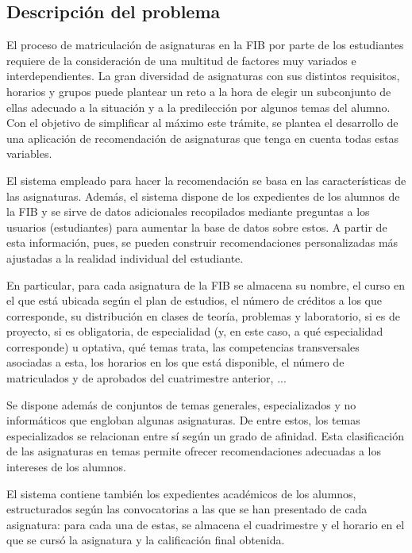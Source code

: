 
\subsection{Descripción del problema} \label{sec:descripcion}

El proceso de matriculación de asignaturas en la FIB por parte de los 
estudiantes requiere de la consideración de una multitud de factores muy 
variados e interdependientes. La gran diversidad de asignaturas con sus 
distintos requisitos, horarios y grupos puede plantear un reto a la hora de 
elegir un subconjunto de ellas adecuado a la situación y a la predilección 
por algunos temas del alumno. Con el objetivo de simplificar al máximo este 
trámite, se plantea el desarrollo de una aplicación de recomendación de 
asignaturas que tenga en cuenta todas estas variables.

El sistema empleado para hacer la recomendación se basa en las características 
de las asignaturas. Además, el sistema dispone de los expedientes de los 
alumnos de la FIB y se sirve de datos adicionales recopilados mediante 
preguntas a los usuarios (estudiantes) para aumentar la base de datos sobre 
estos. A partir de esta información, pues, se pueden construir recomendaciones 
personalizadas más ajustadas a la realidad individual del estudiante.

En particular, para cada asignatura de la FIB se almacena su nombre, el curso 
en el que está ubicada según el plan de estudios, el número de créditos a los 
que corresponde, su distribución en clases de teoría, problemas y laboratorio, 
si es de proyecto, si es obligatoria, de especialidad (y, en este caso, a qué 
especialidad corresponde) u optativa, qué temas trata, las competencias 
transversales asociadas a esta, los horarios en los que está disponible, el 
número de matriculados y de aprobados del cuatrimestre anterior, ...

Se dispone además de conjuntos de temas generales, especializados y no 
informáticos que engloban algunas asignaturas. De entre estos, los temas 
especializados se relacionan entre sí según un grado de afinidad. Esta 
clasificación de las asignaturas en temas permite ofrecer recomendaciones 
adecuadas a los intereses de los alumnos.

El sistema contiene también los expedientes académicos de los alumnos, 
estructurados según las convocatorias a las que se han presentado de cada 
asignatura: para cada una de estas, se almacena el cuadrimestre y el horario 
en el que se cursó la asignatura y la calificación final obtenida.

